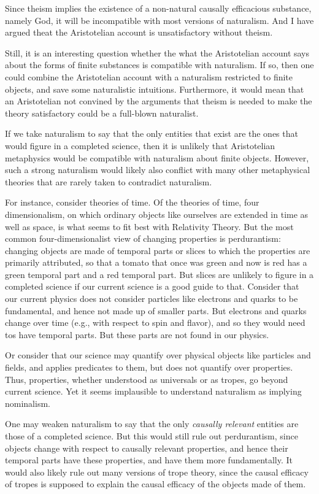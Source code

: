 Since theism implies the existence of a non-natural causally efficacious substance, namely God, it will be incompatible
with most versions of naturalism. And I have argued theat the Aristotelian account is unsatisfactory without
theism. 

Still, it is an interesting question whether the what the Aristotelian account says about the forms of finite
substances is compatible with naturalism. If so, then one could combine the Aristotelian account with 
a naturalism restricted to finite objects, and save some naturalistic intuitions. Furthermore, it would mean
that an Aristotelian not convined by the arguments that theism is needed to make the theory satisfactory could
be a full-blown naturalist.

If we take naturalism to say that the only entities that exist are the ones that would figure in a completed science,
then it is unlikely that Aristotelian metaphysics would be compatible with naturalism about finite objects. However,
such a strong naturalism would likely also conflict with many other metaphysical theories that are rarely taken to 
contradict naturalism. 

For instance, consider theories of time. Of the theories of time, four dimensionalism, on which
ordinary objects like ourselves are extended in time as well as space, is what seems to fit best with Relativity Theory. 
But the most common four-dimensionalist view of changing properties is perdurantism: changing objects are made of temporal parts or
slices to which the properties are primarily attributed, so that a tomato that once was green and now is red has a green temporal part
and a red temporal part. But slices are unlikely to figure in a completed science if
our current science is a good guide to that. Consider that our current physics does not consider particles
like electrons and quarks to be fundamental, and hence not made up of smaller parts. But electrons and quarks change over
time (e.g., with respect to spin and flavor), and so they would need tos have temporal parts.  But these parts are not found
in our physics. 

Or consider that our science may quantify over physical objects like particles and fields, and applies predicates to them, but 
does not quantify over properties. Thus, properties, whether understood as universals or as tropes, go beyond current science.
Yet it seems implausible to understand naturalism as implying nominalism.

One may weaken naturalism to say that the only \textit{causally relevant} entities are those of a completed science. But 
this would still rule out perdurantism, since objects change with respect to causally relevant properties, and hence their
temporal parts have these properties, and have them more fundamentally. It would also likely rule out many versions of trope
theory, since the causal efficacy of tropes is supposed to explain the causal efficacy of the objects made of them.

